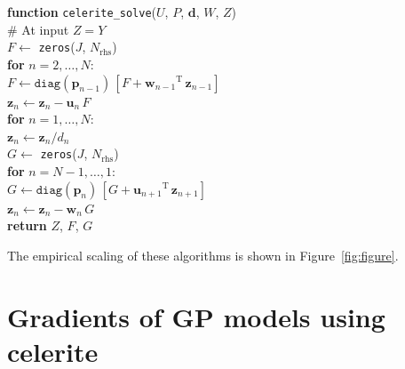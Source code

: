 \documentclass[rnaas]{aastex62}
\newcommand{\figureref}[1]{\ref{fig:#1}}
\newcommand{\Figure}[1]{Figure~\figureref{#1}}
\newcommand{\T}{\ensuremath{\mathrm{T}}}
\newcommand{\bvec}[1]{{\ensuremath{\boldsymbol{#1}}}}
\begin{document}
\medskip
\begin{minipage}{\linewidth}
\textbf{function} \texttt{celerite\_solve}($U$, $P$, $\bvec{d}$, $W$, $Z$) \\
\hspace*{2em}\textsf{\# At input $Z = Y$} \\
\hspace*{2em}$F \gets$ \texttt{zeros}($J$, $N_\mathrm{rhs}$) \\
\hspace*{2em}\textbf{for} $n = 2,\ldots,N$:\\
\hspace*{2em}\hspace*{2em}$F \gets \texttt{diag}(\bvec{p}_{n-1})\,[F +
    {\bvec{w}_{n-1}}^\T\,\bvec{z}_{n-1}]$\\
\hspace*{2em}\hspace*{2em}$\bvec{z}_n \gets \bvec{z}_n - \bvec{u}_n\,F$\\
\hspace*{2em}\textbf{for} $n = 1,\ldots,N$:\\
\hspace*{2em}\hspace*{2em}$\bvec{z}_n \gets \bvec{z}_n / d_{n}$\\
\hspace*{2em}$G \gets$ \texttt{zeros}($J$, $N_\mathrm{rhs}$) \\
\hspace*{2em}\textbf{for} $n = N-1,\ldots,1$:\\
\hspace*{2em}\hspace*{2em}$G \gets \texttt{diag}(\bvec{p}_{n})\,[G +
    {\bvec{u}_{n+1}}^\T\,\bvec{z}_{n+1}]$\\
    \hspace*{2em}\hspace*{2em}$\bvec{z}_n \gets \bvec{z}_n - \bvec{w}_n\,G$\\
\hspace*{2em}\textbf{return} $Z$, $F$, $G$
\end{minipage}
\medskip

\noindent The empirical scaling of these algorithms is shown in
\Figure{figure}.

\section{Gradients of GP models using celerite}
\end{document}
